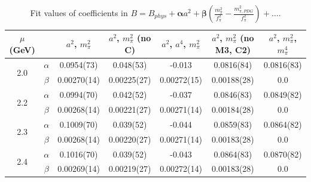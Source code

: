\documentclass[12pt]{extarticle}
\begin{document}
\begin{table}[h!]
\begin{center}
\begin{tabular}{|c c|c|c|c|c|c|}
\hline
$\mu$ (GeV) &  & $a^2$, $m_\pi^2$& $a^2$, $m_\pi^2$ (no C)& $a^2$, $a^4$, $m_\pi^2$& $a^2$, $m_\pi^2$ (no M3, C2)& $a^2$, $m_\pi^2$, $m_\pi^4$\\
\hline
\multirow{2}{0.5in}{2.0} & $\alpha$ & 0.0954(73)& 0.048(53)& -0.013& 0.0816(84)& 0.0816(83)\\
 & $\beta$ & 0.00270(14)& 0.00225(27)& 0.00272(15)& 0.00188(28)& 0.0\\
\hline
\multirow{2}{0.5in}{2.2} & $\alpha$ & 0.0994(70)& 0.042(52)& -0.037& 0.0846(83)& 0.0849(82)\\
 & $\beta$ & 0.00268(14)& 0.00221(27)& 0.00271(14)& 0.00184(28)& 0.0\\
\hline
\multirow{2}{0.5in}{2.3} & $\alpha$ & 0.1009(70)& 0.039(52)& -0.044& 0.0859(83)& 0.0864(82)\\
 & $\beta$ & 0.00268(14)& 0.00220(27)& 0.00271(14)& 0.00183(28)& 0.0\\
\hline
\multirow{2}{0.5in}{2.4} & $\alpha$ & 0.1016(70)& 0.039(52)& -0.043& 0.0864(83)& 0.0870(82)\\
 & $\beta$ & 0.00269(14)& 0.00219(27)& 0.00272(14)& 0.00183(28)& 0.0\\
\hline
\end{tabular}
\caption{Fit values of coefficients in $B = B_{phys} + \mathbf{\alpha} a^2 + \mathbf{\beta}\left(\frac{m_\pi^2}{f_\pi^2}-\frac{m_{\pi,PDG}^2}{f_\pi^2}\right) + \ldots$.}
\end{center}
\end{table}




















\clearpage
\end{document}
